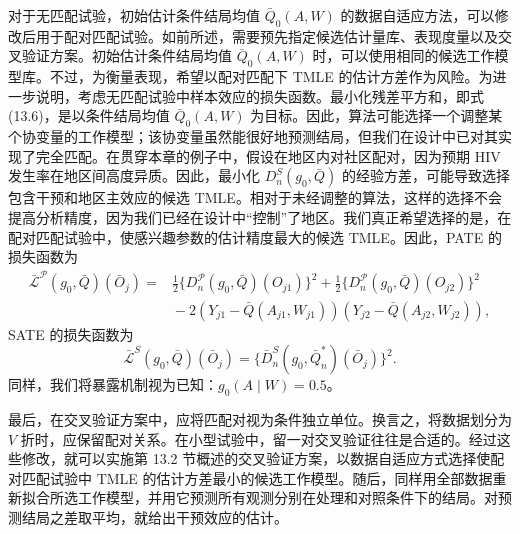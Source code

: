 对于无匹配试验，初始估计条件结局均值 $\bar Q_0(A,W)$ 的数据自适应方法，可以修改后用于配对匹配试验。如前所述，需要预先指定候选估计量库、表现度量以及交叉验证方案。初始估计条件结局均值 $\bar Q_0(A,W)$ 时，可以使用相同的候选工作模型库。不过，为衡量表现，希望以配对匹配下 TMLE 的估计方差作为风险。为进一步说明，考虑无匹配试验中样本效应的损失函数。最小化残差平方和，即式 (13.6)，是以条件结局均值 $\bar Q_0(A,W)$ 为目标。因此，算法可能选择一个调整某个协变量的工作模型；该协变量虽然能很好地预测结局，但我们在设计中已对其实现了完全匹配。在贯穿本章的例子中，假设在地区内对社区配对，因为预期 HIV 发生率在地区间高度异质。因此，最小化 $D_n^S(g_0,\bar Q)$ 的经验方差，可能导致选择包含干预和地区主效应的候选 TMLE。相对于未经调整的算法，这样的选择不会提高分析精度，因为我们已经在设计中“控制”了地区。我们真正希望选择的是，在配对匹配试验中，使感兴趣参数的估计精度最大的候选 TMLE。因此，PATE 的损失函数为
\begin{equation}
 \begin{aligned}
 \bar{\mathcal L}^{\mathcal P}(g_0,\bar Q)(\bar O_j)
 ={}&\frac12\{D_n^{\mathcal P}(g_0,\bar Q)(O_{j1})\}^2
    +\frac12\{D_n^{\mathcal P}(g_0,\bar Q)(O_{j2})\}^2\\
    &{}-2(Y_{j1}-\bar Q(A_{j1},W_{j1}))
          (Y_{j2}-\bar Q(A_{j2},W_{j2})),
 \end{aligned}
 \tag{13.8}
\end{equation}
SATE 的损失函数为
\begin{equation}
 \bar{\mathcal L}^S(g_0,\bar Q)(\bar O_j)
 =\{\bar D_n^S(g_0,\bar Q_n^*)(\bar O_j)\}^2.
 \tag{13.9}
\end{equation}
同样，我们将暴露机制视为已知：$g_0(A\mid W)=0.5$。

最后，在交叉验证方案中，应将匹配对视为条件独立单位。换言之，将数据划分为 $V$ 折时，应保留配对关系。在小型试验中，留一对交叉验证往往是合适的。经过这些修改，就可以实施第 13.2 节概述的交叉验证方案，以数据自适应方式选择使配对匹配试验中 TMLE 的估计方差最小的候选工作模型。随后，同样用全部数据重新拟合所选工作模型，并用它预测所有观测分别在处理和对照条件下的结局。对预测结局之差取平均，就给出干预效应的估计。

